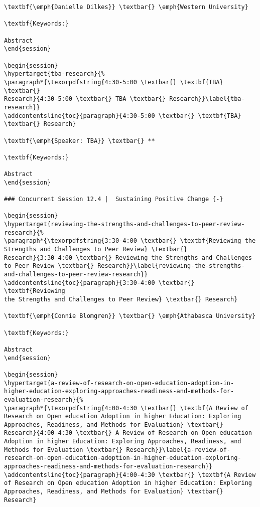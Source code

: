 \documentclass[
]{book}
\begin{document}
\begin{verbatim}
\textbf{\emph{Danielle Dilkes}} \textbar{} \emph{Western University}

\textbf{Keywords:}

Abstract
\end{session}

\begin{session}
\hypertarget{tba-research}{%
\paragraph*{\texorpdfstring{4:30-5:00 \textbar{} \textbf{TBA} \textbar{}
Research}{4:30-5:00 \textbar{} TBA \textbar{} Research}}\label{tba-research}}
\addcontentsline{toc}{paragraph}{4:30-5:00 \textbar{} \textbf{TBA}
\textbar{} Research}

\textbf{\emph{Speaker: TBA}} \textbar{} **

\textbf{Keywords:}

Abstract
\end{session}

### Concurrent Session 12.4 |  Sustaining Positive Change {-}

\begin{session}
\hypertarget{reviewing-the-strengths-and-challenges-to-peer-review-research}{%
\paragraph*{\texorpdfstring{3:30-4:00 \textbar{} \textbf{Reviewing the
Strengths and Challenges to Peer Review} \textbar{}
Research}{3:30-4:00 \textbar{} Reviewing the Strengths and Challenges to Peer Review \textbar{} Research}}\label{reviewing-the-strengths-and-challenges-to-peer-review-research}}
\addcontentsline{toc}{paragraph}{3:30-4:00 \textbar{} \textbf{Reviewing
the Strengths and Challenges to Peer Review} \textbar{} Research}

\textbf{\emph{Connie Blomgren}} \textbar{} \emph{Athabasca University}

\textbf{Keywords:}

Abstract
\end{session}

\begin{session}
\hypertarget{a-review-of-research-on-open-education-adoption-in-higher-education-exploring-approaches-readiness-and-methods-for-evaluation-research}{%
\paragraph*{\texorpdfstring{4:00-4:30 \textbar{} \textbf{A Review of
Research on Open education Adoption in higher Education: Exploring
Approaches, Readiness, and Methods for Evaluation} \textbar{}
Research}{4:00-4:30 \textbar{} A Review of Research on Open education Adoption in higher Education: Exploring Approaches, Readiness, and Methods for Evaluation \textbar{} Research}}\label{a-review-of-research-on-open-education-adoption-in-higher-education-exploring-approaches-readiness-and-methods-for-evaluation-research}}
\addcontentsline{toc}{paragraph}{4:00-4:30 \textbar{} \textbf{A Review
of Research on Open education Adoption in higher Education: Exploring
Approaches, Readiness, and Methods for Evaluation} \textbar{} Research}


\end{verbatim}
\end{document}
